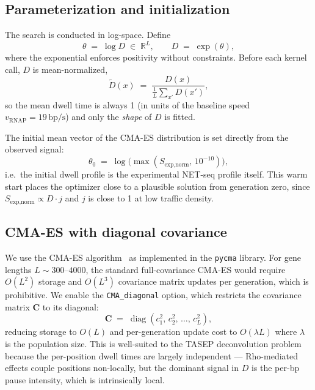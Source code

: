 \documentclass[11pt]{article}
\begin{document}
\subsection{Parameterization and initialization}

The search is conducted in log-space. Define
\begin{equation}
  \theta \;=\; \log D \;\in\; \mathbb{R}^L,
  \qquad D \;=\; \exp(\theta),
\end{equation}
where the exponential enforces positivity without constraints. Before each
kernel call, $D$ is mean-normalized,
\begin{equation}
  \tilde{D}(x) \;=\; \frac{D(x)}{\frac{1}{L}\sum_{x'} D(x')},
\end{equation}
so the mean dwell time is always 1 (in units of the baseline speed
$v_{\text{RNAP}} = 19\,\text{bp/s}$) and only the \emph{shape} of $D$ is
fitted.

The initial mean vector of the CMA-ES distribution is set directly from the
observed signal:
\begin{equation}
  \theta_0 \;=\; \log\bigl(\max(S_{\text{exp,norm}},\, 10^{-10})\bigr),
\end{equation}
i.e.\ the initial dwell profile is the experimental NET-seq profile itself.
This warm start places the optimizer close to a plausible solution from
generation zero, since $S_{\text{exp,norm}} \propto D \cdot j$ and $j$ is
close to 1 at low traffic density.

\subsection{CMA-ES with diagonal covariance}

We use the CMA-ES algorithm~\cite{hansen2016cma} as implemented in the
\texttt{pycma} library. For gene lengths $L \sim 300\text{--}4000$, the
standard full-covariance CMA-ES would require $O(L^2)$ storage and $O(L^3)$
covariance matrix updates per generation, which is prohibitive. We enable the
\texttt{CMA\_diagonal} option, which restricts the covariance matrix
$\mathbf{C}$ to its diagonal:
\begin{equation}
  \mathbf{C} \;=\; \operatorname{diag}(c_1^2,\, c_2^2,\, \ldots,\, c_L^2),
\end{equation}
reducing storage to $O(L)$ and per-generation update cost to $O(\lambda L)$
where $\lambda$ is the population size. This is well-suited to the TASEP
deconvolution problem because the per-position dwell times are largely
independent — Rho-mediated effects couple positions non-locally, but the
dominant signal in $D$ is the per-bp pause intensity, which is intrinsically
local.
\end{document}
